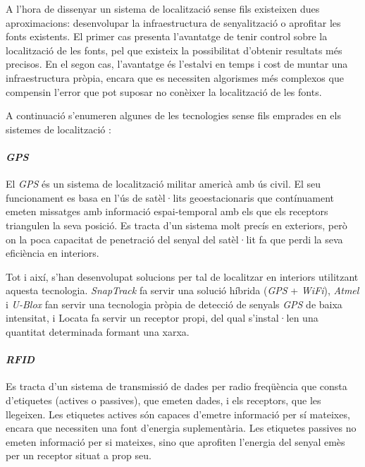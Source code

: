 A l'hora de dissenyar un sistema de localització sense fils existeixen dues aproximacions: desenvolupar la infraestructura de senyalització o aprofitar les fonts existents. El primer cas presenta l'avantatge de tenir control sobre la localització de les fonts, pel que existeix la possibilitat d'obtenir resultats més precisos. En el segon cas, l'avantatge és l'estalvi en temps i cost de muntar una infraestructura pròpia, encara que es necessiten algorismes més complexos que compensin l'error que pot suposar no conèixer la localització de les fonts.

A continuació s'enumeren algunes de les tecnologies sense fils emprades en els sistemes de localització \cite{liu}:

\paragraph{\textit{GPS}}

El \textit{GPS} és un sistema de localització militar americà amb ús civil. El seu funcionament es basa en l’ús de satèl·lits geoestacionaris que contínuament emeten missatges amb informació espai-temporal amb els que els receptors triangulen la seva posició. Es tracta d’un sistema molt precís en exteriors, però on la poca capacitat de penetració del senyal del satèl·lit fa que perdi la seva eficiència en interiors.

Tot i així, s'han desenvolupat solucions per tal de localitzar en interiors utilitzant aquesta tecnologia. \textit{SnapTrack}\cite{moeglein} fa servir una solució híbrida (\textit{GPS} + \textit{WiFi}), \textit{Atmel}\cite{liu} i \textit{U-Blox} \cite{wieser} fan servir una tecnologia pròpia de detecció de senyals \textit{GPS} de baixa intensitat, i Locata \cite{barnes} fa servir un receptor propi, del qual s'instal·len una quantitat determinada formant una xarxa.

\paragraph{\textit{RFID}}

Es tracta d'un sistema de transmissió de dades per radio freqüència que consta d'etiquetes (actives o passives), que emeten dades, i els receptors, que les llegeixen. Les etiquetes actives són capaces d’emetre informació per sí mateixes, encara que necessiten una font d'energia suplementària. Les etiquetes passives no emeten informació per si mateixes, sino que aprofiten l'energia del senyal emès per un receptor situat a prop seu.

